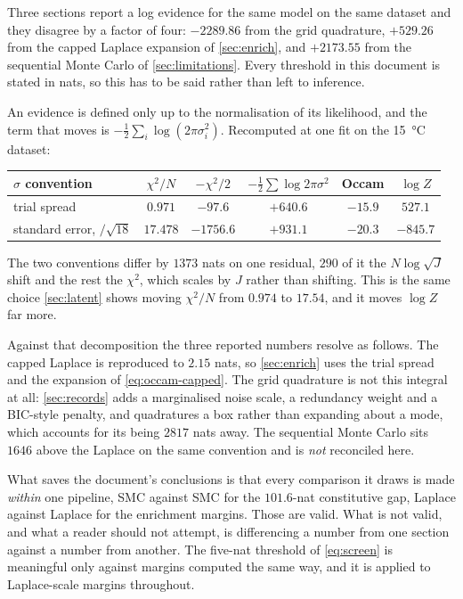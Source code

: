 \documentclass[10pt]{article}
\begin{document}
Three sections report a log evidence for the same model on the same dataset and they disagree by
a factor of four: $-2289.86$ from the grid quadrature, $+529.26$ from the capped Laplace
expansion of \cref{sec:enrich}, and $+2173.55$ from the sequential Monte Carlo of
\cref{sec:limitations}. Every threshold in this document is stated in nats, so this has to be
said rather than left to inference.

An evidence is defined only up to the normalisation of its likelihood, and the term that moves
is $-\tfrac12\sum_i \log(2\pi\sigma_i^2)$. Recomputed at one fit on the \SI{15}{\celsius}
dataset:

\begin{center}
\begin{tabular}{lccccc}
\toprule
$\sigma$ convention & $\chi^2/N$ & $-\chi^2/2$ & $-\tfrac12\sum\log 2\pi\sigma^2$ & Occam & $\log Z$ \\
\midrule
trial spread & $0.971$ & $-97.6$ & $+640.6$ & $-15.9$ & $\mathbf{527.1}$ \\
standard error, $/\sqrt{18}$ & $17.478$ & $-1756.6$ & $+931.1$ & $-20.3$ & $-845.7$ \\
\bottomrule
\end{tabular}
\end{center}

\noindent The two conventions differ by $1373$ nats on one residual, $290$ of it the
$N\log\sqrt{J}$ shift and the rest the $\chi^2$, which scales by $J$ rather than shifting. This
is the same choice \cref{sec:latent} shows moving $\chi^2/N$ from $0.974$ to $17.54$, and it
moves $\log Z$ far more.

Against that decomposition the three reported numbers resolve as follows. The capped Laplace is
reproduced to $2.15$ nats, so \cref{sec:enrich} uses the trial spread and the expansion of
\eqref{eq:occam-capped}. The grid quadrature is not this integral at all: \cref{sec:records}
adds a marginalised noise scale, a redundancy weight and a BIC-style penalty, and quadratures a
box rather than expanding about a mode, which accounts for its being $2817$ nats away. The
sequential Monte Carlo sits $1646$ above the Laplace on the same convention and is \emph{not}
reconciled here.

What saves the document's conclusions is that every comparison it draws is made \emph{within}
one pipeline, SMC against SMC for the $101.6$-nat constitutive gap, Laplace against Laplace
for the enrichment margins. Those are valid. What is not valid, and what a reader should not
attempt, is differencing a number from one section against a number from another. The five-nat
threshold of \eqref{eq:screen} is meaningful only against margins computed the same way, and it
is applied to Laplace-scale margins throughout.
\end{document}

